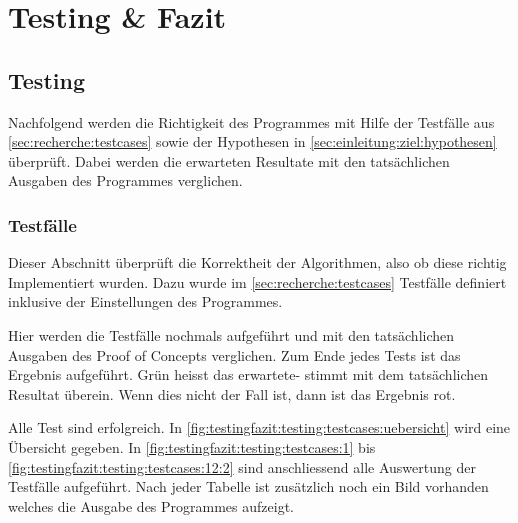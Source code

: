 
\chapter{Testing \& Fazit}
\label{sec:testingfazit}

\section{Testing}
\label{sec:testingfazit:testing}
Nachfolgend werden die Richtigkeit des Programmes mit Hilfe der Testfälle aus \cref{sec:recherche:testcases}  sowie der Hypothesen in \cref{sec:einleitung:ziel:hypothesen}  überprüft. Dabei werden die erwarteten Resultate mit den tatsächlichen Ausgaben des Programmes verglichen.

\subsection{Testfälle}
\label{sec:testingfazit:testing:testcases}
Dieser Abschnitt überprüft die Korrektheit der Algorithmen, also ob diese richtig Implementiert wurden. Dazu wurde im \cref{sec:recherche:testcases} Testfälle definiert inklusive der Einstellungen des Programmes.

Hier werden die Testfälle nochmals aufgeführt und mit den tatsächlichen Ausgaben des Proof of Concepts verglichen. Zum Ende jedes Tests ist das Ergebnis aufgeführt. \colorbox{green!25}{Grün} heisst das erwartete- stimmt mit dem tatsächlichen Resultat überein. Wenn dies nicht der Fall ist, dann ist das Ergebnis \colorbox{red!25}{rot}.

Alle Test sind erfolgreich. In \cref{fig:testingfazit:testing:testcases:uebersicht} wird eine Übersicht gegeben. In \cref{fig:testingfazit:testing:testcases:1} bis \cref{fig:testingfazit:testing:testcases:12:2} sind anschliessend alle Auswertung der Testfälle aufgeführt. Nach jeder Tabelle ist zusätzlich noch ein Bild vorhanden welches die Ausgabe des Programmes aufzeigt.

